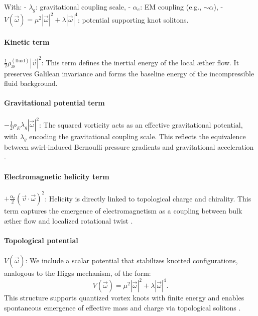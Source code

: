 With:
- \( \lambda_g \): gravitational coupling scale,
- \( \alpha_e \): EM coupling (e.g., \( \sim \alpha \)),
- \( V(\vec{\omega}) = \mu^2 |\vec{\omega}|^2 + \lambda |\vec{\omega}|^4 \): potential supporting knot solitons.

\paragraph{Kinetic term}
$\frac{1}{2} \rho_\text{\ae}^{(\text{fluid})} |\vec{v}|^2$:
This term defines the inertial energy of the local \ae{}ther flow. It preserves Galilean invariance and forms the baseline energy of the incompressible fluid background.

\paragraph{Gravitational potential term}
$-\frac{1}{2} \rho_{\scriptscriptstyle\boldsymbol\!E}\lambda_g |\vec{\omega}|^2$:
The squared vorticity acts as an effective gravitational potential, with $\lambda_g$ encoding the gravitational coupling scale. This reflects the equivalence between swirl-induced Bernoulli pressure gradients and gravitational acceleration \cite{helmholtz1858integrals, batchelor2000introduction}.

\paragraph{Electromagnetic helicity term}
$+\frac{\alpha_e}{2} (\vec{v} \cdot \vec{\omega})^2$:
Helicity is directly linked to topological charge and chirality. This term captures the emergence of electromagnetism as a coupling between bulk æther flow and localized rotational twist \cite{moffatt1969degree, kato1990topological}.

\paragraph{Topological potential}
$V(\vec{\omega})$:
We include a scalar potential that stabilizes knotted configurations, analogous to the Higgs mechanism, of the form:
\begin{equation}
V(\vec{\omega}) = \mu^2 |\vec{\omega}|^2 + \lambda |\vec{\omega}|^4.
\end{equation}
This structure supports quantized vortex knots with finite energy and enables spontaneous emergence of effective mass and charge via topological solitons \cite{ranada1990topological, arrayas2017knots}.

